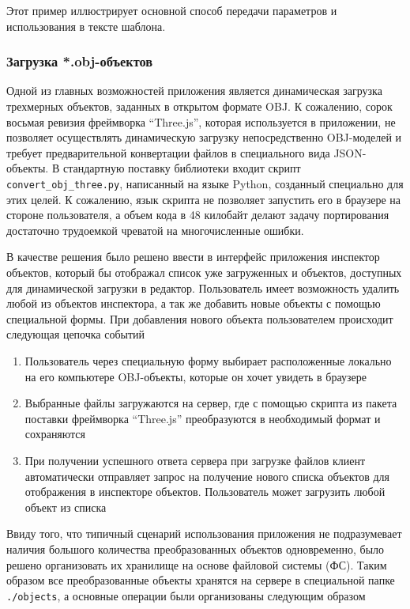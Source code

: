 \documentclass[12pt, a4paper]{article}
\begin{document}
Этот пример иллюстрирует основной способ передачи параметров и использования в
тексте шаблона.

\subsubsection{Загрузка *.obj-объектов}

Одной из главных возможностей приложения является динамическая загрузка
трехмерных объектов, заданных в открытом формате OBJ. К сожалению, сорок восьмая
ревизия фреймворка ``Three.js'', которая используется в приложении, не позволяет
осуществлять динамическую загрузку непосредственно OBJ-моделей и требует
предварительной
конвертации файлов в специального вида JSON-объекты. В стандартную поставку
библиотеки входит скрипт \texttt{convert\_obj\_three.py}, написанный на языке
Python, созданный специально для этих целей. К сожалению, язык
скрипта не позволяет запустить его в браузере на стороне пользователя, а объем
кода в 48 килобайт делают задачу портирования достаточно трудоемкой чреватой на
многочисленные ошибки.

В качестве решения было решено ввести в интерфейс приложения инспектор объектов,
который бы отображал список уже загруженных и объектов,
доступных для динамической загрузки в редактор. Пользователь имеет возможность
удалить любой из объектов инспектора, а так же добавить новые объекты с помощью
специальной формы. При добавления нового объекта пользователем происходит
следующая цепочка событий

\begin{enumerate}
    \item Пользователь через специальную форму выбирает расположенные локально
    на его компьютере OBJ-объекты, которые он хочет увидеть в браузере
    \item Выбранные файлы загружаются на сервер, где с помощью скрипта из
    пакета поставки фреймворка ``Three.js'' преобразуются в необходимый формат и
    сохраняются
    \item При получении успешного ответа сервера при загрузке файлов клиент
    автоматически отправляет запрос на получение нового списка объектов для
    отображения в инспекторе объектов. Пользователь может загрузить любой
    объект из списка
\end{enumerate}

Ввиду того, что типичный сценарий использования приложения не подразумевает
наличия большого количества преобразованных объектов одновременно, было решено
организовать их хранилище на основе файловой системы (ФС). Таким образом все
преобразованные объекты хранятся на сервере в специальной папке
\texttt{./objects}, а основные операции были организованы следующим
образом
\end{document}
